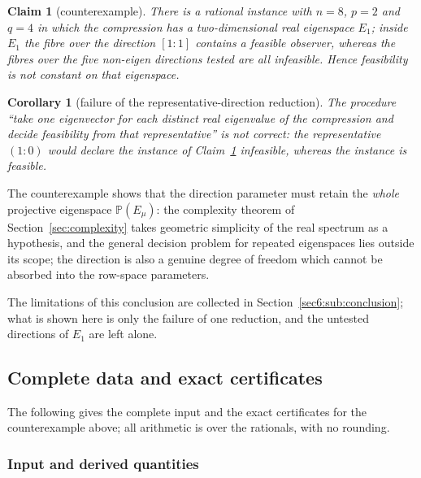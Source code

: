 \documentclass[journal]{IEEEtran}
\theoremstyle{plainn}
\newtheorem{cor}{Corollary}
\newtheorem{claim}{Claim}
\theoremstyle{remark}
\begin{document}
\begin{claim}[counterexample]\label{sec6:prop:nonconstant}
There is a rational instance with $n=8$, $p=2$ and $q=4$ in which the compression has a
two-dimensional real eigenspace $E_1$; inside $E_1$ the fibre over the direction $[1\!:\!1]$ contains
a feasible observer, whereas the fibres over the five non-eigen directions tested are all infeasible.
Hence feasibility is not constant on that eigenspace.
\end{claim}

\begin{cor}[failure of the representative-direction reduction]\label{sec6:cor:reduction}
The procedure ``take one eigenvector for each distinct real eigenvalue of the compression and decide
feasibility from that representative'' is not correct: the representative $(1\!:\!0)$ would declare the
instance of Claim~\ref{sec6:prop:nonconstant} infeasible, whereas the instance is feasible.
\end{cor}

The counterexample shows that the direction parameter must retain the \emph{whole} projective eigenspace
$\mathbb{P}(E_\mu)$: the complexity theorem of Section~\ref{sec:complexity} takes geometric simplicity of
the real spectrum as a hypothesis, and the general decision problem for repeated eigenspaces lies
outside its scope; the direction is also a genuine degree of freedom which cannot be absorbed into the
row-space parameters.


The limitations of this conclusion are collected in Section~\ref{sec6:sub:conclusion}; what is shown
here is only the failure of one reduction, and the untested directions of $E_1$ are left alone.

\subsection{Complete data and exact certificates}\label{appA:data}

The following gives the complete input and the exact certificates for the counterexample above; all
arithmetic is over the rationals, with no rounding.

\subsubsection{Input and derived quantities}
\end{document}
